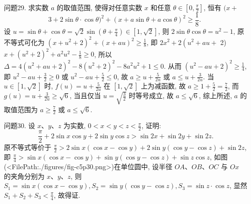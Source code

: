 问题29. 求实数 $a$ 的取值范围, 使得对任意实数 $x$ 和任意 $\theta \in\left[0, \frac{\pi}{2}\right]$, 恒有 $(x+$
$$
3+2 \sin \theta \cdot \cos \theta)^2+(x+a \sin \theta+a \cos \theta)^2 \geqslant \frac{1}{8} \text {. }
$$
设 $u=\sin \theta+\cos \theta=\sqrt{2} \sin \left(\theta+\frac{\pi}{4}\right) \in[1, \sqrt{2}]$, 则 $2 \sin \theta \cos \theta= u^2-1$, 原不等式可化为 $\left(x+u^2+2\right)^2+(x+a u)^2 \geqslant \frac{1}{8}$, 即 $2 x^2+2\left(u^2+a u+\right.$ 2) $x+\left(u^2+2\right)^2+a^2 u^2-\frac{1}{8} \geqslant 0$, 所以 $\Delta=4\left(u^2+a u+2\right)^2-8\left(u^2+2\right)^2- 8 a^2 u^2+1 \leqslant 0$. 从而 $\left(u^2-a u+2\right)^2 \geqslant \frac{1}{4}$, 即 $u^2-a u+\frac{3}{2} \geqslant 0$ 或 $u^2-a u+ \frac{5}{2} \leqslant 0$, 故 $a \geqslant u+\frac{5}{2 u}$ 或 $a \leqslant u+\frac{3}{2 u}$. 当 $u \in[1, \sqrt{2}]$ 时, $f(u)=u+\frac{5}{2 u}$ 在 $[1, \sqrt{2}]$ 上为减函数, 故 $a \geqslant 1+\frac{5}{2}=\frac{7}{2}$, 而 $g(u)=u+\frac{3}{2 u} \geqslant \sqrt{6}$, 当且仅当 $u=\sqrt{\frac{3}{2}}$ 时等号成立, 故 $a \leqslant \sqrt{6}$, 综上所述, $a$ 的取值范围为 $a \geqslant \frac{7}{2}$ 或 $a \leqslant \sqrt{6}$.



问题30. 设 $x 、 y 、 z$ 为实数, $0<x<y<z<\frac{\pi}{2}$, 证明:
$$
\frac{\pi}{2}+2 \sin x \cos y+2 \sin y \cos z>\sin 2 x+\sin 2 y+\sin 2 z .
$$
原不等式等价于 $\frac{\pi}{2}>2 \sin x(\cos x- \cos y)+2 \sin y(\cos y-\cos z)+\sin 2 z$, 即 $\frac{\pi}{4}> \sin x(\cos x-\cos y)+\sin y(\cos y-\cos z)+ \sin z \cos z$, 如图(<FilePath:./figures/fig-c5p30.png>)在单位圆中, 设半径 $O A 、 O B 、 O C$ 与 $O x$ 的夹角分别为 $x 、 y 、 z$, 则 $S_1=\sin x(\cos x- \cos y), S_2=\sin y(\cos y-\cos z), S_3=\sin z \cdot \cos z$, 显然 $S_1+S_2+S_3<\frac{\pi}{4}$, 故得证.


